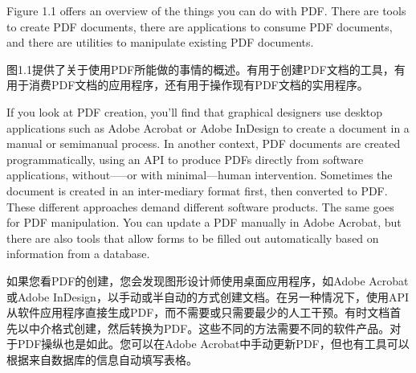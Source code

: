 \documentclass{book}
\begin{document}
Figure 1.1 offers an overview of the things you can do with PDF. There are tools to create PDF documents, there are applications to consume PDF documents, and there are utilities to manipulate existing PDF documents.

图1.1提供了关于使用PDF所能做的事情的概述。有用于创建PDF文档的工具，有用于消费PDF文档的应用程序，还有用于操作现有PDF文档的实用程序。

If you look at PDF creation, you’ll find that graphical designers use desktop applications such as Adobe Acrobat or Adobe InDesign to create a document in a manual or semimanual process. In another context, PDF documents are created programmatically, using an API to produce PDFs directly from software applications, without—--or with minimal—human intervention. Sometimes the document is created in an inter-mediary format first, then converted to PDF. These different approaches demand different software products. The same goes for PDF manipulation. You can update a PDF
manually in Adobe Acrobat, but there are also tools that allow forms to be filled out automatically based on information from a database.

如果您看PDF的创建，您会发现图形设计师使用桌面应用程序，如Adobe Acrobat或Adobe InDesign，以手动或半自动的方式创建文档。在另一种情况下，使用API从软件应用程序直接生成PDF，而不需要或只需要最少的人工干预。有时文档首先以中介格式创建，然后转换为PDF。这些不同的方法需要不同的软件产品。对于PDF操纵也是如此。您可以在Adobe Acrobat中手动更新PDF，但也有工具可以根据来自数据库的信息自动填写表格。
\end{document}
